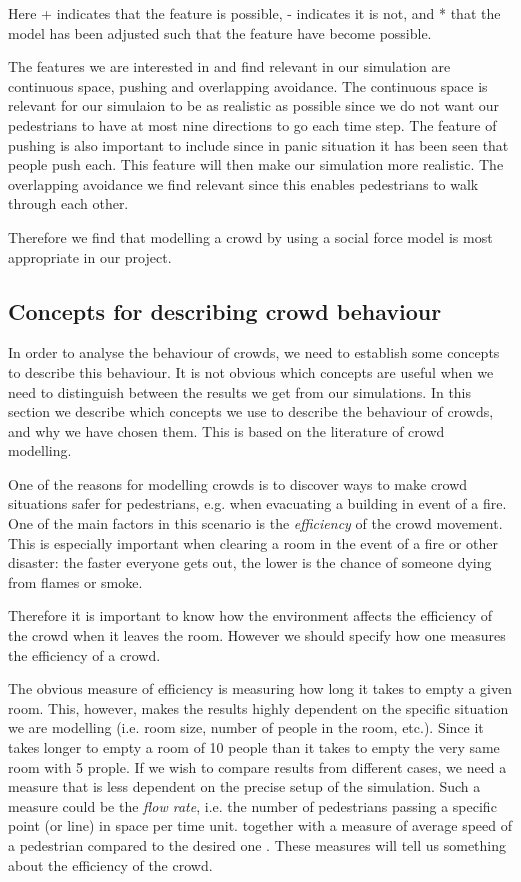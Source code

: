 Here + indicates that the feature is possible, - indicates it is not, and * that 
the model has been adjusted such that the feature have become possible. \cite{Comparison}

The features we are interested in and find relevant in our simulation are 
continuous space, pushing and overlapping avoidance. The continuous space is 
relevant for our simulaion to be as realistic as possible since we do not want 
our pedestrians to have at most nine directions to go each time step.
The feature of pushing is also important to include since in panic situation it 
has been seen that people push each. This feature will then make our simulation 
more realistic. The overlapping avoidance we find relevant since this enables 
pedestrians to walk through each other.

Therefore we find that modelling a crowd by using a social force model is most 
appropriate in our project. 


\subsection{Concepts for describing crowd behaviour}
In order to analyse the behaviour of crowds, we need to establish some 
concepts to describe this behaviour. It is not obvious which concepts  are 
useful when we need to distinguish between the results we get from our 
simulations. In this section we describe which concepts we use to describe the 
behaviour of crowds, and why we have chosen them. This is based on the 
literature of crowd modelling.

One of the reasons for modelling crowds is to discover ways to make crowd 
situations safer for pedestrians, e.g. when evacuating a building in event of 
a fire. One of the main factors in this scenario is the \emph{efficiency} of 
the crowd movement. This is especially important when clearing a room in the 
event of a fire or other disaster: the faster everyone gets out, the lower is 
the chance of someone dying from flames or smoke.

Therefore it is important to know how the environment affects the efficiency 
of the crowd when it leaves the room. However we should specify how one 
measures the efficiency of a crowd.

The obvious measure of efficiency is measuring how long it takes to empty a 
given room. This, however, makes the results highly dependent on the specific 
situation we are modelling (i.e. room size, number of people in the room, 
etc.). Since it takes longer to empty a room of 10 people than it takes to
empty the very same room with 5 prople. If we wish to compare results from 
different cases, we need a measure that is less dependent on the precise setup
of the simulation. Such a measure could be the \emph{flow rate}, i.e. the number 
of pedestrians passing a specific point (or line) in space per time unit.
together with a measure of average speed of a pedestrian compared to the 
desired one \cite{self-org}. These measures will tell us something about the
efficiency of the crowd.

